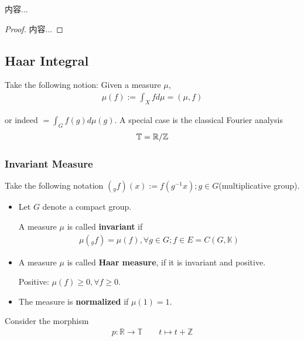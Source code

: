 \documentclass[Total.tex]{subfiles}
\begin{document}
			\begin{corollary}
				内容...
			\end{corollary}
			\begin{proof}
				内容...
			\end{proof}
			\subsection{Haar Integral}
			
			Take the following notion: Given a measure $\mu$,
			\begin{gather*}
				\mu(f):=\int_X fd\mu=(\mu,f)
			\end{gather*}
			
			or indeed $=\int_G f(g)d\mu(g)$. A special case is the classical Fourier analysis
			\begin{gather*}
				\mathbb{T}=\mathbb{R}/\mathbb{Z}
			\end{gather*}
			
			\subsubsection{Invariant Measure}
			
			Take the following notation $(_gf)(x):=f(g^{-1}x);g\in G$(multiplicative group).
			
			\begin{Def}
				\begin{itemize}
					\item Let $G$ denote a compact group.
					
					A measure $\mu$ is called \textbf{invariant} if
					\begin{gather*}
						\mu(_g f)=\mu(f),\forall g\in G;f\in E=C(G,\mathbb{K})
					\end{gather*}
					\item A measure $\mu$ is called \textbf{Haar measure}, if it is invariant and positive.
					
					Positive: $\mu(f)\geq 0,\forall f\geq 0$.
					\item The measure is \textbf{normalized} if $\mu(1)=1$.
				\end{itemize}
			\end{Def}
			
			\begin{example}
				Consider the morphism
				\begin{gather*}
					p:\mathbb{R}\rightarrow \mathbb{T}\qquad t\mapsto t+\mathbb{Z}
				\end{gather*}
			\end{example}
			
\end{document}

